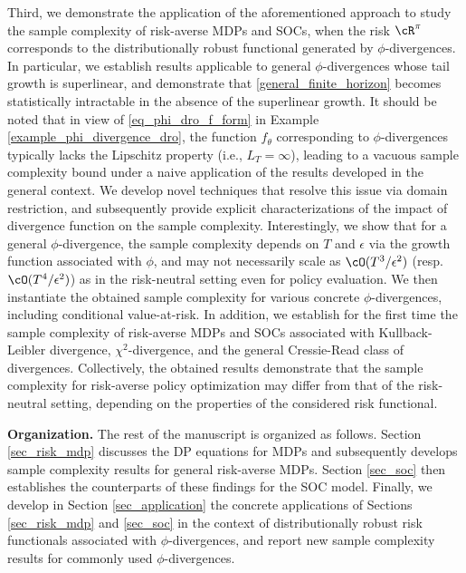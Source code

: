 \documentclass[9pt]{article}
\numberwithin{equation}{section}
\begin{document}
 
 Third, we demonstrate the application of the aforementioned approach to study the sample complexity of risk-averse MDPs and SOCs, when the risk $\cR^\pi$ corresponds to the distributionally robust functional generated by $\phi$-divergences. 
In particular, we establish results applicable to general $\phi$-divergences whose tail growth is superlinear, and demonstrate that \eqref{general_finite_horizon} becomes statistically intractable in the absence of the superlinear growth. 
It should be noted that in view of \eqref{eq_phi_dro_f_form} in Example \ref{example_phi_divergence_dro}, the function $f_\theta$ corresponding to $\phi$-divergences typically lacks the Lipschitz property (i.e., $L_T =\infty$), leading to a vacuous sample complexity bound under a naive application of the results  developed in the general context. 
  We develop novel techniques that resolve this issue via domain restriction,  and subsequently provide explicit characterizations of the impact of divergence function on the sample complexity. 
Interestingly, we show that for a general $\phi$-divergence, the sample complexity depends on $T$ and $\epsilon$ via the growth function associated with $\phi$,
and may not necessarily scale as $\cO(T^3/\epsilon^2)$ (resp. $\cO(T^4/\epsilon^2)$) as in the risk-neutral setting even for policy evaluation.
We then instantiate the obtained sample complexity for various concrete $\phi$-divergences, including conditional value-at-risk. 
In addition, we establish for the first time the sample complexity of risk-averse MDPs and SOCs associated with 
Kullback-Leibler divergence, $\chi^2$-divergence, and the general Cressie-Read class of divergences. 
Collectively, the obtained results demonstrate that the sample complexity for risk-averse policy optimization may differ from that of the risk-neutral setting, depending on the properties of the considered risk functional. 
 
 
 \vspace{0.05in}

{\bf Organization.}
The rest of the manuscript is organized as follows. 
 Section \ref{sec_risk_mdp} discusses the DP equations for MDPs and subsequently develops sample complexity results for general risk-averse MDPs. 
Section \ref{sec_soc} then establishes the counterparts of these findings for the SOC model. 
Finally, we develop in Section \ref{sec_application} the concrete applications of Sections \ref{sec_risk_mdp} and \ref{sec_soc} in the context of distributionally robust risk functionals associated with $\phi$-divergences, 
and report new sample complexity results for commonly used $\phi$-divergences. 
\end{document}
